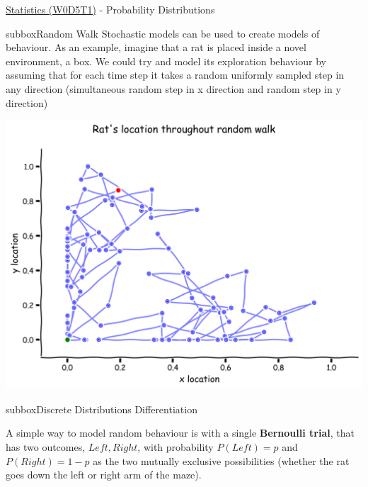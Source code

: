 \clearpage
\begin{textbox}{\href{https://compneuro.neuromatch.io/tutorials/W0D5_Statistics/student/W0D5_Tutorial1.html}{Statistics (W0D5T1)} - Probability Distributions}
\begin{subbox}{subbox}{Random Walk}
\scriptsize
Stochastic models can be used to create models of behaviour. As an example, imagine that a rat is placed inside a novel environment, a box. We could try and model its exploration behaviour by assuming that for each time step it takes a random uniformly sampled step in any direction (simultaneous random step in x direction and random step in y direction)

\centering
\includegraphics[scale=0.08]{Figures/PreCourse/SFigure1.png}
\end{subbox}

\begin{subbox}{subbox}{Discrete Distributions Differentiation}
\scriptsize{

A simple way to model random behaviour is with a single \textbf{Bernoulli trial}, that has two outcomes, {$Left, Right$}, with probability $P(Left)=p$ and $P(Right)=1-p$ as the two mutually exclusive possibilities (whether the rat goes down the left or right arm of the maze).

}
\end{subbox}
\end{textbox}
